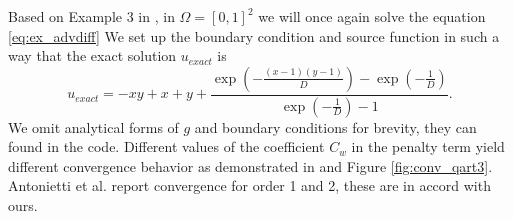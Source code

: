 \begin{example}
\label{ex:quart3}
Based on Example 3 in \cite{Antonietti2013},
in $\Omega = [0, 1]^2$ we will once again solve the equation \eqref{eq:ex_advdiff}
We set up the boundary condition and source function in such a way that the exact
solution $u_{exact}$ is
\begin{equation}
	u_{exact} = -xy + x +y + \frac{\exp{\left(-\frac{{\left(x - 1\right)} {\left(y -
	1\right)}}{D}\right)} -
	\exp{\left(-\frac{1}{D}\right)}}{\exp{\left(-\frac{1}{D}\right)}
	- 1}.
\end{equation}
We omit analytical forms of $g$ and boundary conditions for brevity, they can found in
the code. Different values of the coefficient $C_w$ in the penalty term yield different
convergence behavior as demonstrated in  and Figure \ref{fig:conv_qart3}. Antonietti et al. \cite{Antonietti2013} report convergence
for order 1 and 2, these are in accord with ours.
\end{example}

